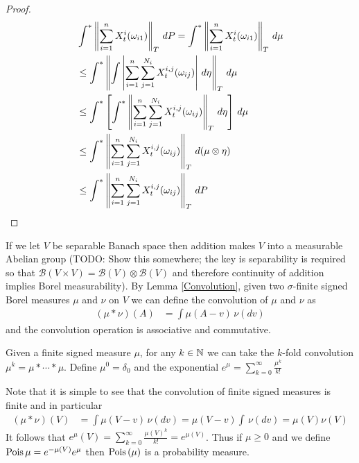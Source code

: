 \begin{proof}
\begin{align*}
&\int^* \left \lVert \sum_{i=1}^n X^i_t(\omega_{i1}) \right \rVert_{T} \, dP
= \int^* \left \lVert \sum_{i=1}^n X^i_t(\omega_{i1}) \right \rVert_{T} \, d\mu \\
&\leq \int^* \left \lVert \int \left \vert \sum_{i=1}^n \sum_{j=1}^{N_i} X_t^{i,j}(\omega_{ij}) \right \vert \, d\eta \right \rVert_{T}  \, d\mu\\
&\leq \int^* \left[ \int^* \left \lVert \sum_{i=1}^n \sum_{j=1}^{N_i} X_t^{i,j}(\omega_{ij}) \right \rVert_{T} \, d\eta \right ] \, d\mu \\
&\leq \int^* \left \lVert \sum_{i=1}^n \sum_{j=1}^{N_i} X_t^{i,j}(\omega_{ij}) \right \rVert_{T}  \, d(\mu \otimes \eta) \\
&\leq \int^* \left \lVert \sum_{i=1}^n \sum_{j=1}^{N_i} X_t^{i,j}(\omega_{ij}) \right \rVert_{T}  \, dP \\
\end{align*}
\end{proof}

If we let $V$ be separable Banach space then addition makes $V$ into a measurable Abelian group (TODO: Show this somewhere; the key is separability is required so that $\mathcal{B}(V \times V) = \mathcal{B}(V) \otimes \mathcal{B}(V)$ and therefore continuity of addition implies Borel measurability).  By Lemma \ref{Convolution}, given two $\sigma$-finite signed Borel measures $\mu$ and $\nu$ on $V$ we can define the convolution of $\mu$ and $\nu$ as 
\begin{align*}
(\mu * \nu)(A) &= \int \mu(A - v) \, \nu(dv) 
\end{align*}
and the convolution operation is associative and commutative.  
\begin{defn}Given a finite signed measure $\mu$, for any $k \in \mathbb{N}$ we can take the $k$-fold convolution $\mu^k = \mu * \dotsb * \mu$.  Define $\mu^0 = \delta_0$ and the exponential $e^{\mu} = \sum_{k=0}^\infty \frac{\mu^k}{k!}$
\end{defn}

Note that it is simple to see that the convolution of finite signed measures is finite and in particular 
\begin{align*}
(\mu * \nu)(V) &= \int \mu(V - v) \, \nu(dv) = \mu(V - v) \int \, \nu(dv) = \mu(V) \nu(V)
\end{align*}
It follows that $e^{\mu}(V) = \sum_{k=0}^\infty \frac{\mu(V)^k}{k!} = e^{\mu(V)}$.  Thus if $\mu \geq 0$ and we define $\operatorname*{Pois}{\mu} = e^{-\mu(V)} e^\mu $ then $\operatorname*{Pois} \left( \mu \right)$ is a probability measure.

